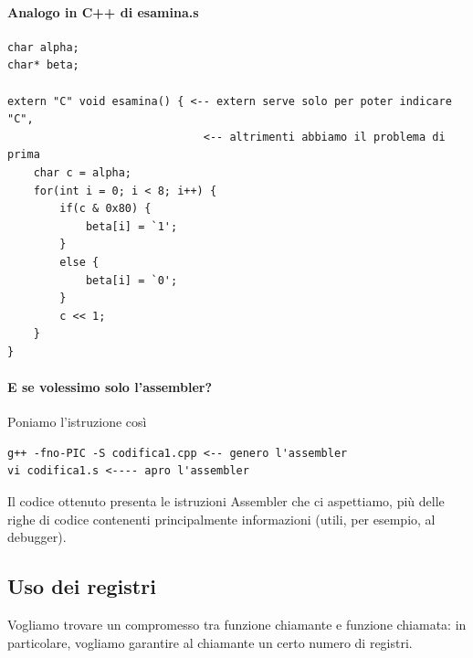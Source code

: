 \documentclass[11pt]{report}
\theoremstyle{definition}
\begin{document}
\paragraph{Analogo in C++ di esamina.s}
\begin{verbatim}
char alpha;
char* beta;

extern "C" void esamina() { <-- extern serve solo per poter indicare "C", 
                              <-- altrimenti abbiamo il problema di prima
    char c = alpha;
    for(int i = 0; i < 8; i++) {
        if(c & 0x80) {
            beta[i] = `1';
        }
        else {
            beta[i] = `0';
        }
        c << 1;
    }
}
\end{verbatim}

\paragraph{E se volessimo solo l'assembler?} Poniamo l'istruzione così
\begin{verbatim}
g++ -fno-PIC -S codifica1.cpp <-- genero l'assembler
vi codifica1.s <---- apro l'assembler
\end{verbatim}
Il codice ottenuto presenta le istruzioni Assembler che ci aspettiamo, più delle righe di codice contenenti principalmente informazioni (utili, per esempio, al debugger).

\clearpage \subsection{Uso dei registri} 
Vogliamo trovare un compromesso tra funzione chiamante e funzione chiamata: in particolare, vogliamo garantire al chiamante un certo numero di registri.
\end{document}
